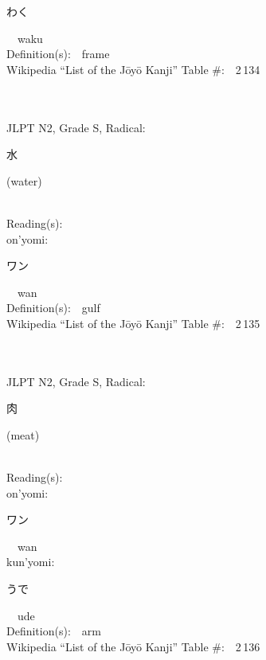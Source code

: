 \begin{multicols}{2}
{\hspace*{2em}}{\begin{CJK}{UTF8}{min} わく \end{CJK}}\ \ waku\ \ \\
Definition(s):\ \ frame \\
Wikipedia ``List of the J\=oy\=o Kanji'' Table \#:\ \ 2\,134 \\
\ \ \\
{\fontsize{34pt}{40pt}  }\ \ \\  %
{JLPT N2, Grade S, Radical:\ \ {\begin{CJK}{UTF8}{min} 水 \end{CJK}} (water) } \\
Reading(s):\ \ \\
{\hspace*{1em}}on'yomi:\ \ \\
{\hspace*{2em}}{\begin{CJK}{UTF8}{min} ワン \end{CJK}}\ \ wan\ \ \\
Definition(s):\ \ gulf \\
Wikipedia ``List of the J\=oy\=o Kanji'' Table \#:\ \ 2\,135 \\
\ \ \\
{\fontsize{34pt}{40pt}  }\ \ \\  %
{JLPT N2, Grade S, Radical:\ \ {\begin{CJK}{UTF8}{min} 肉 \end{CJK}} (meat) } \\
Reading(s):\ \ \\
{\hspace*{1em}}on'yomi:\ \ \\
{\hspace*{2em}}{\begin{CJK}{UTF8}{min} ワン \end{CJK}}\ \ wan\ \ \\
{\hspace*{1em}}kun'yomi:\ \ \\
{\hspace*{2em}}{\begin{CJK}{UTF8}{min} うで \end{CJK}}\ \ ude\ \ \\
Definition(s):\ \ arm \\
Wikipedia ``List of the J\=oy\=o Kanji'' Table \#:\ \ 2\,136 \\
\ \ \\
\end{multicols}

\newpage



